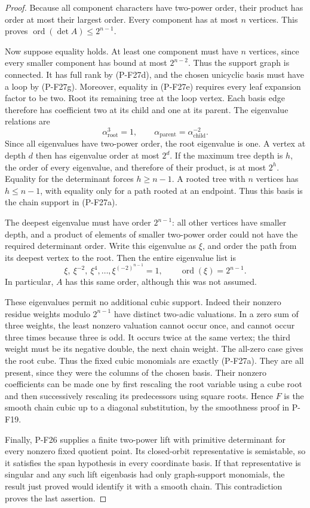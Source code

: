 \documentclass[11pt,a4paper]{article}
\begin{document}
\begin{proof}
Because all component characters have two-power order,
their product has order at most their largest order.
Every component has at most $n$ vertices. This proves
$\operatorname{ord}(\det A)\le2^{n-1}$.

Now suppose equality holds. At least one component must
have $n$ vertices, since every smaller component has
bound at most $2^{n-2}$. Thus the support graph is
connected. It has full rank by (P-F27d), and the chosen
unicyclic basis must have a loop by (P-F27g). Moreover,
equality in (P-F27e) requires every leaf expansion factor
to be two. Root its remaining tree at the loop vertex.
Each basis edge therefore has coefficient two at its
child and one at its parent. The eigenvalue relations are
\[
 \alpha_{\mathrm{root}}^3=1,\qquad
 \alpha_{\mathrm{parent}}=\alpha_{\mathrm{child}}^{-2}.
 \tag{P-F27h}
\]
Since all eigenvalues have two-power order, the root
eigenvalue is one. A vertex at depth $d$ then has
eigenvalue order at most $2^d$. If the maximum tree
depth is $h$, the order of every eigenvalue, and therefore
of their product, is at most $2^h$. Equality for the
determinant forces $h\ge n-1$. A rooted tree with $n$
vertices has $h\le n-1$, with equality only for a path
rooted at an endpoint. Thus this basis is the chain
support in (P-F27a).

The deepest eigenvalue must have order $2^{n-1}$: all
other vertices have smaller depth, and a product of
elements of smaller two-power order could not have the
required determinant order. Write this eigenvalue as
$\xi$, and order the path from its deepest vertex to the
root. Then the entire eigenvalue list is
\[
 \xi,\ \xi^{-2},\ \xi^4,\ldots,
 \xi^{(-2)^{n-1}}=1,
 \qquad \operatorname{ord}(\xi)=2^{n-1}.
 \tag{P-F27i}
\]
In particular, $A$ has this same order, although this
was not assumed.

These eigenvalues permit no additional cubic support.
Indeed their nonzero residue weights modulo $2^{n-1}$
have distinct two-adic valuations. In a zero sum of
three weights, the least nonzero valuation cannot occur
once, and cannot occur three times because three is
odd. It occurs twice at the same vertex; the third
weight must be its negative double, the next chain
weight. The all-zero case gives the root cube. Thus the
fixed cubic monomials are exactly (P-F27a). They are all
present, since they were the columns of the chosen basis.
Their nonzero coefficients can be made one by first
rescaling the root variable using a cube root and then
successively rescaling its predecessors using square
roots. Hence $F$ is the smooth chain cubic up to a
diagonal substitution, by the smoothness proof in P-F19.

Finally, P-F26 supplies a finite two-power lift with
primitive determinant for every nonzero fixed quotient
point. Its closed-orbit representative is semistable,
so it satisfies the span hypothesis in every coordinate
basis. If that representative is singular and any such
lift eigenbasis had only graph-support monomials, the
result just proved would identify it with a smooth
chain. This contradiction proves the last assertion.
\end{proof}
\end{document}
